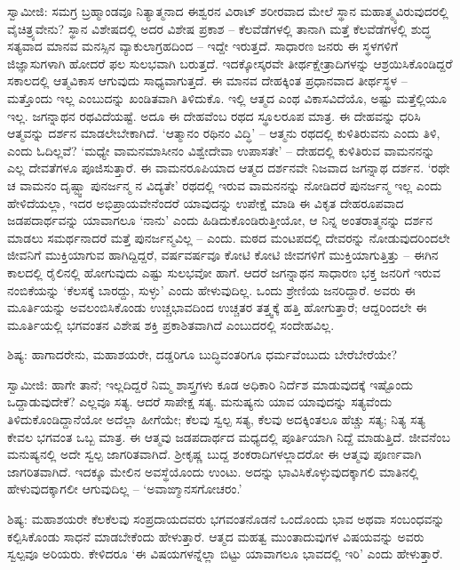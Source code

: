 ಸ್ವಾಮೀಜಿ: ಸಮಗ್ರ ಬ್ರಹ್ಮಾಂಡವೂ ನಿತ್ಯಾತ್ಮನಾದ ಈಶ್ವರನ ವಿರಾಟ್ ಶರೀರವಾದ ಮೇಲೆ ಸ್ಥಾನ ಮಹಾತ್ಮ್ಯವಿರುವುದರಲ್ಲಿ ವೈಚಿತ್ರ್ಯವೇನು? ಸ್ಥಾನ ವಿಶೇಷದಲ್ಲಿ ಅದರ ವಿಶೇಷ ಪ್ರಕಾಶ – ಕೆಲವೆಡೆಗಳಲ್ಲಿ ತಾನಾಗಿ ಮತ್ತೆ ಕೆಲವೆಡೆಗಳಲ್ಲಿ ಶುದ್ಧ ಸತ್ಯವಾದ ಮಾನವ ಮನಸ್ಸಿನ ವ್ಯಾಕುಲಾಗ್ರಹದಿಂದ – ಇದ್ದೇ ಇರುತ್ತದೆ. ಸಾಧಾರಣ ಜನರು ಈ ಸ್ಥಳಗಳಿಗೆ ಜಿಜ್ಞಾಸುಗಳಾಗಿ ಹೋದರೆ ಫಲ ಸುಲಭವಾಗಿ ಬರುತ್ತದೆ. ಇದಕ್ಕೋಸ್ಕರವೇ ತೀರ್ಥಕ್ಷೇತ್ರಾದಿಗಳನ್ನು ಆಶ್ರಯಿಸಿಕೊಂಡಿದ್ದರೆ ಸಕಾಲದಲ್ಲಿ ಆತ್ಮವಿಕಾಸ ಆಗುವುದು ಸಾಧ್ಯವಾಗುತ್ತದೆ. ಈ ಮಾನವ ದೇಹಕ್ಕಿಂತ ಪ್ರಧಾನವಾದ ತೀರ್ಥಸ್ಥಳ – ಮತ್ತೊಂದು ಇಲ್ಲ ಎಂಬುದನ್ನು ಖಂಡಿತವಾಗಿ ತಿಳಿದುಕೊ. ಇಲ್ಲಿ ಆತ್ಮದ ಎಂಥ ವಿಕಾಸವಿದೆಯೊ, ಅಷ್ಟು ಮತ್ತೆಲ್ಲಿಯೂ ಇಲ್ಲ. ಜಗನ್ನಾಥನ ರಥವಿದೆಯಷ್ಟೆ. ಅದೂ ಈ ದೇಹವೆಂಬ ರಥದ ಸ್ಥೂಲರೂಪ ಮಾತ್ರ. ಈ ದೇಹವನ್ನು ಧರಿಸಿ ಆತ್ಮವನ್ನು ದರ್ಶನ ಮಾಡಲೇಬೇಕಾಗಿದೆ. ‘ಆತ್ಮಾನಂ ರಥಿನಂ ವಿದ್ಧಿ’ – ಆತ್ಮನು ರಥದಲ್ಲಿ ಕುಳಿತಿರುವನು ಎಂದು ತಿಳಿ, ಎಂದು ಓದಿಲ್ಲವೆ? ‘ಮಧ್ಯೇ ವಾಮನಮಾಸೀನಂ ವಿಶ್ವೇದೇವಾ ಉಪಾಸತೇ’ – ದೇಹದಲ್ಲಿ ಕುಳಿತಿರುವ ವಾಮನನನ್ನು ಎಲ್ಲ ದೇವತೆಗಳೂ ಪೂಜಿಸುತ್ತಾರೆ. ಈ ವಾಮನರೂಪಿಯಾದ ಆತ್ಮದ ದರ್ಶನವೇ ನಿಜವಾದ ಜಗನ್ನಾಥ ದರ್ಶನ. ‘ರಥೇ ಚ ವಾಮನಂ ದೃಷ್ಟ್ವಾ ಪುನರ್ಜನ್ಮ ನ ವಿದ್ಯತೇ’ ರಥದಲ್ಲಿ ಇರುವ ವಾಮನನನ್ನು ನೋಡಿದರೆ ಪುನರ್ಜನ್ಮ ಇಲ್ಲ ಎಂದು ಹೇಳಿದೆಯಲ್ಲಾ, ಇದರ ಅಭಿಪ್ರಾಯವೇನೆಂದರೆ ಯಾವುದನ್ನು ಉಪೇಕ್ಷೆ ಮಾಡಿ ಈ ವಿಕೃತ ದೇಹರೂಪವಾದ ಜಡಪದಾರ್ಥವನ್ನು ಯಾವಾಗಲೂ ‘ನಾನು’ ಎಂದು ಹಿಡಿದುಕೊಂಡಿರುತ್ತೀಯೋ, ಆ ನಿನ್ನ ಅಂತರಾತ್ಮನನ್ನು ದರ್ಶನ ಮಾಡಲು ಸಮರ್ಥನಾದರೆ ಮತ್ತೆ ಪುನರ್ಜನ್ಮವಿಲ್ಲ – ಎಂದು. ಮಠದ ಮಂಟಪದಲ್ಲಿ ದೇವರನ್ನು ನೋಡುವುದರಿಂದಲೇ ಜೀವನಿಗೆ ಮುಕ್ತಿಯಾಗುವ ಹಾಗಿದ್ದಿದ್ದರೆ, ವರ್ಷವರ್ಷವೂ ಕೋಟಿ ಕೋಟಿ ಜೀವಗಳಿಗೆ ಮುಕ್ತಿಯಾಗುತ್ತಿತ್ತು – ಈಗಿನ ಕಾಲದಲ್ಲಿ ರೈಲಿನಲ್ಲಿ ಹೋಗುವುದು ಎಷ್ಟು ಸುಲಭವೋ ಹಾಗೆ. ಆದರೆ ಜಗನ್ನಾಥನ ಸಾಧಾರಣ ಭಕ್ತ ಜನರಿಗೆ ಇರುವ ನಂಬಿಕೆಯನ್ನು ‘ಕೆಲಸಕ್ಕೆ ಬಾರದ್ದು, ಸುಳ್ಳು’ ಎಂದು ಹೇಳುವುದಿಲ್ಲ. ಒಂದು ಶ್ರೇಣಿಯ ಜನರಿದ್ದಾರೆ. ಅವರು ಈ ಮೂರ್ತಿಯನ್ನು ಅವಲಂಬಿಸಿಕೊಂಡು ಉಚ್ಚಭಾವದಿಂದ ಉಚ್ಚತರ ತತ್ತ್ವಕ್ಕೆ ಹತ್ತಿ ಹೋಗುತ್ತಾರೆ; ಆದ್ದರಿಂದಲೇ ಈ ಮೂರ್ತಿಯಲ್ಲಿ ಭಗವಂತನ ವಿಶೇಷ ಶಕ್ತಿ ಪ್ರಕಾಶಿತವಾಗಿದೆ ಎಂಬುದರಲ್ಲಿ ಸಂದೇಹವಿಲ್ಲ.

ಶಿಷ್ಯ: ಹಾಗಾದರೇನು, ಮಹಾಶಯರೇ, ದಡ್ಡರಿಗೂ ಬುದ್ಧಿವಂತರಿಗೂ ಧರ್ಮವೆಂಬುದು ಬೇರೆಬೇರೆಯೇ?

ಸ್ವಾಮೀಜಿ: ಹಾಗೇ ತಾನೆ; ಇಲ್ಲದಿದ್ದರೆ ನಿಮ್ಮ ಶಾಸ್ತ್ರಗಳು ಕೂಡ ಅಧಿಕಾರಿ ನಿರ್ದೆಶ ಮಾಡುವುದಕ್ಕೆ ಇಷ್ಟೊಂದು ಒದ್ದಾಡುವುದೇಕೆ? ಎಲ್ಲವೂ ಸತ್ಯ. ಆದರೆ ಸಾಪೇಕ್ಷ ಸತ್ಯ. ಮನುಷ್ಯನು ಯಾವ ಯಾವುದನ್ನು ಸತ್ಯವೆಂದು ತಿಳಿದುಕೊಂಡಿದ್ದಾನೆಯೋ ಅದೆಲ್ಲಾ ಹೀಗೆಯೇ; ಕೆಲವು ಸ್ವಲ್ಪ ಸತ್ಯ, ಕೆಲವು ಅದಕ್ಕಿಂತಲೂ ಹೆಚ್ಚು ಸತ್ಯ; ನಿತ್ಯ ಸತ್ಯ ಕೇವಲ ಭಗವಂತ ಒಬ್ಬ ಮಾತ್ರ. ಈ ಆತ್ಮವು ಜಡಪದಾರ್ಥದ ಮಧ್ಯದಲ್ಲಿ ಪೂರ್ತಿಯಾಗಿ ನಿದ್ದೆ ಮಾಡುತ್ತಿದೆ. ಜೀವನೆಂಬ ಮನುಷ್ಯನಲ್ಲಿ ಅದೇ ಸ್ವಲ್ಪ ಜಾಗರಿತವಾಗಿದೆ. ಶ‍್ರೀಕೃಷ್ಣ ಬುದ್ದ ಶಂಕರಾದಿಗಳಲ್ಲಾದರೋ ಈ ಆತ್ಮವು ಪೂರ್ಣವಾಗಿ ಜಾಗರಿತವಾಗಿದೆ. ಇದಕ್ಕೂ ಮೇಲಿನ ಅವಸ್ಥೆಯೊಂದು ಉಂಟು. ಅದನ್ನು ಭಾವಿಸಿಕೊಳ್ಳುವುದಕ್ಕಾಗಲಿ ಮಾತಿನಲ್ಲಿ ಹೇಳುವುದಕ್ಕಾಗಲೀ ಆಗುವುದಿಲ್ಲ – ‘ಅವಾಙ್ಮಾನಸಗೋಚರಂ.’

ಶಿಷ್ಯ: ಮಹಾಶಯರೇ ಕೆಲಕೆಲವು ಸಂಪ್ರದಾಯದವರು ಭಗವಂತನೊಡನೆ ಒಂದೊಂದು ಭಾವ ಅಥವಾ ಸಂಬಂಧವನ್ನು ಕಲ್ಪಿಸಿಕೊಂಡು ಸಾಧನೆ ಮಾಡಬೇಕೆಂದು ಹೇಳುತ್ತಾರೆ. ಆತ್ಮದ ಮಹತ್ವ ಮುಂತಾದುವುಗಳ ವಿಷಯವನ್ನು ಅವರು ಸ್ವಲ್ಪವೂ ಅರಿಯರು. ಕೇಳಿದರೂ ‘ಈ ವಿಷಯಗಳನ್ನೆಲ್ಲಾ ಬಿಟ್ಟು ಯಾವಾಗಲೂ ಭಾವದಲ್ಲಿ ಇರಿ’ ಎಂದು ಹೇಳುತ್ತಾರೆ.

